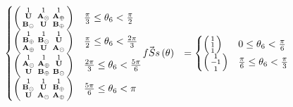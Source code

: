 \begin{gather*}
\begin{aligned}
\begin{cases}
 \left(
\begin{smallmatrix}
 1              & 1             & 1  \\
 \elemU    & \elemAm & \elemAp \\
 \elemBm  & \elemU   & \elemBp \\
\end{smallmatrix}
\right) & \frac{\pi }{3}\leq \mTheta{6} <\frac{\pi }{2} \\
 \left(
\begin{smallmatrix}
 1              & 1             & 1  \\
 \elemBp   & \elemBm & \elemU \\
 \elemAp   & \elemU   & \elemAm \\
\end{smallmatrix}
\right) & \frac{\pi }{2}\leq \mTheta{6} <\frac{2 \pi }{3} \\
 \left(
\begin{smallmatrix}
 1              & 1             & 1  \\
 \elemAm  & \elemAp & \elemU \\
 \elemU     & \elemBp  & \elemBm \\
\end{smallmatrix}
\right)  & \frac{2 \pi }{3}\leq \mTheta{6} <\frac{5 \pi }{6} \\
\left(
\begin{smallmatrix}
 1              & 1             & 1  \\
 \elemBm  & \elemU   & \elemBp \\
 \elemU    & \elemAm & \elemAp \\
\end{smallmatrix}
\right)  & \frac{5 \pi }{6}\leq \mTheta{6} <\pi 
\end{cases} &
 \fSs[\theta]  &=
\begin{cases}
\left( \begin{smallmatrix}  1 \\    1 \\   1\\ \end{smallmatrix} \right) & 0                   \leq    \mTheta{6}  < \frac{   \pi }{6} \\
\left( \begin{smallmatrix}  1 \\  -1 \\   1\\ \end{smallmatrix} \right) & \frac{  \pi }{6} \leq  \mTheta{6}  < \frac{   \pi }{3} \\

\end{cases}
\end{aligned}
\end{gather*}
